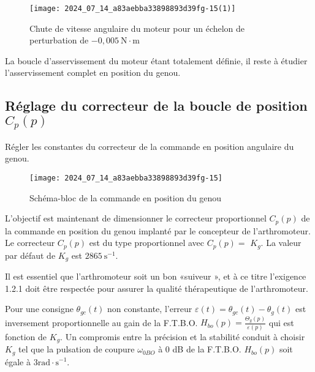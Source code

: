 
\begin{figure}[!h]\centering
\texttt{[image: 2024\_07\_14\_a83aebba33898893d39fg-15(1)]}
\caption{\label{fig:ccs_mp_2024:fig:25}Chute de vitesse angulaire du moteur pour un échelon de perturbation de $-0,005 \mathrm{~N} \cdot \mathrm{m}$}
\end{figure}
La boucle d'asservissement du moteur étant totalement définie, il reste à étudier l'asservissement complet en position du genou.

\subsection{Réglage du correcteur de la boucle de position $C_{p}(p)$}

\begin{obj}
Régler les constantes du correcteur de la commande en position angulaire du genou.
\end{obj}

\begin{figure}[!h]\centering
\texttt{[image: 2024\_07\_14\_a83aebba33898893d39fg-15]}
\caption{\label{fig:ccs_mp_2024:fig:26}Schéma-bloc de la commande en position du genou}
\end{figure}
L'objectif est maintenant de dimensionner le correcteur proportionnel $C_{p}(p)$ de la commande en position du genou implanté par le concepteur de l'arthromoteur. Le correcteur $C_{p}(p)$ est du type proportionnel avec $C_{p}(p)=$ $K_{g}$. La valeur par défaut de $K_{g}$ est $2865 \mathrm{~s}^{-1}$.

Il est essentiel que l'arthromoteur soit un bon «suiveur », et à ce titre l'exigence 1.2.1 doit être respectée pour assurer la qualité thérapeutique de l'arthromoteur.

Pour une consigne $\theta_{g c}(t)$ non constante, l'erreur $\varepsilon(t)=\theta_{g c}(t)-\theta_{g}(t)$ est inversement proportionnelle au gain de la F.T.B.O. $H_{b o}(p)=\frac{\Theta_{g}(p)}{\varepsilon(p)}$ qui est fonction de $K_{g}$. Un compromis entre la précision et la stabilité conduit à choisir $K_{g}$ tel que la pulsation de coupure $\omega_{0 B O}$ à 0 dB de la F.T.B.O. $H_{b o}(p)$ soit égale à $3 \mathrm{rad} \cdot \mathrm{s}^{-1}$.

